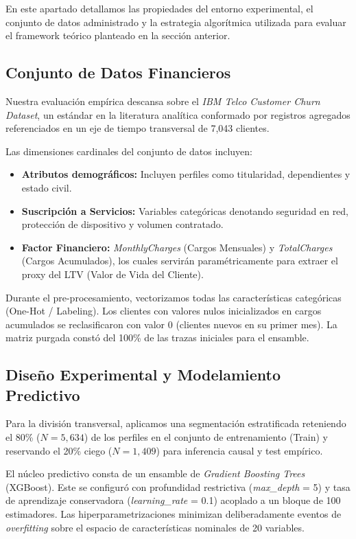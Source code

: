 En este apartado detallamos las propiedades del entorno experimental, el conjunto de datos administrado y la estrategia algorítmica utilizada para evaluar el framework teórico planteado en la sección anterior.

\subsection{Conjunto de Datos Financieros}
Nuestra evaluación empírica descansa sobre el \textit{IBM Telco Customer Churn Dataset}, un estándar en la literatura analítica conformado por registros agregados referenciados en un eje de tiempo transversal de 7,043 clientes. 

Las dimensiones cardinales del conjunto de datos incluyen:
\begin{itemize}
    \item \textbf{Atributos demográficos:} Incluyen perfiles como titularidad, dependientes y estado civil.
    \item \textbf{Suscripción a Servicios:} Variables categóricas denotando seguridad en red, protección de dispositivo y volumen contratado.
    \item \textbf{Factor Financiero:} \textit{MonthlyCharges} (Cargos Mensuales) y \textit{TotalCharges} (Cargos Acumulados), los cuales servirán paramétricamente para extraer el proxy del LTV (Valor de Vida del Cliente).
\end{itemize}

Durante el pre-procesamiento, vectorizamos todas las características categóricas (One-Hot / Labeling). Los clientes con valores nulos inicializados en cargos acumulados se reclasificaron con valor 0 (clientes nuevos en su primer mes). La matriz purgada constó del 100\% de las trazas iniciales para el ensamble.

\subsection{Diseño Experimental y Modelamiento Predictivo}
Para la división transversal, aplicamos una segmentación estratificada reteniendo el 80\% ($N=5,634$) de los perfiles en el conjunto de entrenamiento (Train) y reservando el 20\% ciego ($N=1,409$) para inferencia causal y test empírico. 

El núcleo predictivo consta de un ensamble de \textit{Gradient Boosting Trees} (XGBoost). Este se configuró con profundidad restrictiva (\textit{max\_depth} = 5) y tasa de aprendizaje conservadora (\textit{learning\_rate} = 0.1) acoplado a un bloque de 100 estimadores. Las hiperparametrizaciones minimizan deliberadamente eventos de \textit{overfitting} sobre el espacio de características nominales de 20 variables.

